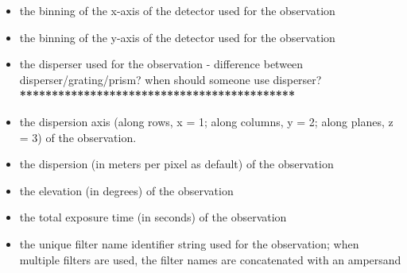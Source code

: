 \documentclass[letterpaper,10pt,english]{sphinxmanual}
\begin{document}
\begin{itemize}
\item {} 
the binning of the x-axis of the detector used for the observation

\end{itemize}

\begin{itemize}
\item {} 
the binning of the y-axis of the detector used for the observation

\end{itemize}

\begin{itemize}
\item {} 
the disperser used for the observation - difference between
disperser/grating/prism? when should someone use disperser? \textbf{*******************************************}

\end{itemize}

\begin{itemize}
\item {} 
the dispersion axis (along rows, x = 1; along columns, y = 2; along planes,
z = 3) of the observation.

\end{itemize}

\begin{itemize}
\item {} 
the dispersion (in meters per pixel as default) of the observation

\end{itemize}

\begin{itemize}
\item {} 
the elevation (in degrees) of the observation

\end{itemize}

\begin{itemize}
\item {} 
the total exposure time (in seconds) of the observation

\end{itemize}

\begin{itemize}
\item {} 
the unique filter name identifier string used for the observation; when
multiple filters are used, the filter names are concatenated with an
ampersand

\end{itemize}
\end{document}
